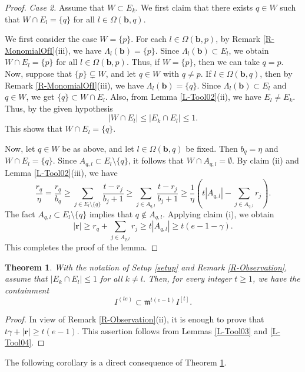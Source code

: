\documentclass[12pt,reqno]{amsart}
\newtheorem{thm}{Theorem}[section]
\theoremstyle{definition}
\newcommand{\mi}{\mathfrak{m}}
\newcommand{\bb}{\mathbf{b}}
\newcommand{\br}{\mathbf{r}}
\newcommand{\Om}{\Omega}
\newcommand{\Lm}{\Lambda}
\numberwithin{equation}{section}
\begin{document}
\begin{proof}
    \medskip\noindent
    \textit{Case 2.} Assume that $W \subset E_k.$ We first claim that there exists $q \in W$ such that $W \cap E_l = \{q\}$ for all $l \in \Om(\bb, q).$ 
    
    We first consider the case  $W = \{p\}.$ For each $l \in \Om(\bb, p)$, by Remark \ref{R-MonomialOfI}(iii), we have $\Lm_l(\bb) = \{p\}.$ Since $\Lm_l(\bb) \subset E_l$, we obtain $W \cap E_l = \{p\}$ for all $l \in \Om(\bb, p).$ Thus, if $W = \{p\}$, then we can take $q = p.$ Now, suppose that $\{p\} \subsetneq W$, and let $q \in W$ with $q \ne p.$ If $l \in \Om(\bb, q)$, then by Remark \ref{R-MonomialOfI}(iii), we have $\Lm_l(\bb) = \{q\}.$ Since $\Lm_l(\bb) \subset E_l$ and $q \in W$, we get $\{q\} \subset W \cap E_l.$ Also, from Lemma \ref{L-Tool02}(ii), we have $E_l \ne E_k.$ Thus, by the given hypothesis 
    \[|W \cap E_l| \le |E_k \cap E_l| \le 1.\]
    This shows that $W \cap E_l = \{q\}.$

    Now, let $q \in W$ be as above, and let $l \in \Om(\bb, q)$ be fixed. Then $b_q = \eta$ and $W \cap E_l = \{q\}.$ Since $A_{q, l} \subset E_l \setminus \{q\}$, it follows that $W \cap A_{q, l} = \emptyset.$ By claim (ii) and Lemma \ref{L-Tool02}(iii), we have
    \[\dfrac{r_q}{\eta} = \dfrac{r_q}{b_q} \ge \sum_{j \in E_l \setminus \{q\}} \dfrac{t - r_j}{b_j + 1} \ge \sum_{j \in A_{q, l}}\dfrac{t - r_j}{b_j + 1} \ge \dfrac{1}{\eta} \left( t |A_{q, l}| - \sum_{j \in A_{q, l}} r_j \right).\]
    The fact $A_{q, l} \subset E_l \setminus \{q\}$ implies that $q \notin A_{q, l}.$ Applying claim (i), we obtain
    \[|\br| \ge r_q + \sum_{j \in A_{q, l}} r_j \ge t |A_{q, l}| \ge t(e - 1 - \gamma).\]
    This completes the proof of the lemma.
\end{proof}

\begin{thm}\label{Th-MainTheorem}
    With the notation of Setup \ref{setup} and Remark \ref{R-Observation}, assume that $|E_k \cap E_l| \le 1$ for all $k \ne l.$ Then, for every integer $t \ge 1$, we have the containment
    \[I^{(te)} \subset \mi^{t(e - 1)} I^{[t]}.\]
\end{thm}

\begin{proof}
    In view of Remark \ref{R-Observation}(ii), it is enough to prove that $t \gamma + |\br| \ge t(e - 1).$ This assertion follows from Lemmas \ref{L-Tool03} and \ref{L-Tool04}.
\end{proof}

The following corollary is a direct consequence of Theorem \ref{Th-MainTheorem}.
\end{document}
